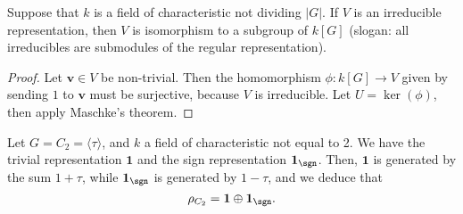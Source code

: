 \documentclass{willowtreebook}
\begin{document}
\begin{corollary}
Suppose that $k$ is a field of characteristic not dividing $|G|$.  If $V$ is an irreducible representation, then $V$ is isomorphism to a subgroup of $k[G]$ (slogan: all irreducibles are submodules of the regular representation). 
\end{corollary}
\begin{proof}
    Let $\mathbf{v} \in V$ be non-trivial. Then the homomorphism $\phi \colon k[G] \to V$ given by sending $1$ to $\mathbf{v}$ must be surjective, because $V$ is irreducible. Let $U = \ker(\phi)$, then apply Maschke's theorem. 
\end{proof}
\begin{example}
    Let $G = C_2 = \langle \tau \rangle$, and $k$ a field of characteristic not equal to 2. We have the trivial representation $\mathbf{1}$ and the sign representation $\mathbf{1}_{\sgn}$. Then, $\mathbf{1}$ is generated by the sum $1+\tau$, while $\mathbf{1}_{\sgn}$ is generated by $1-\tau$, and we deduce that 
    \[
\rho_{C_2} = \mathbf{1} \oplus \mathbf{1}_{\sgn}. 
    \]
\end{example}
\end{document}
